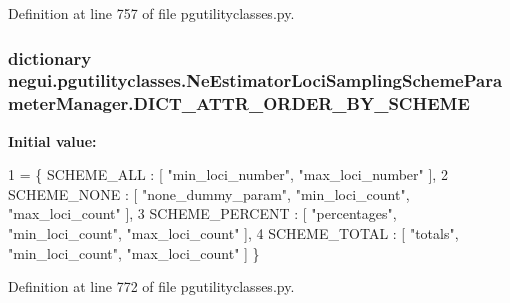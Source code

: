 Definition at line 757 of file pgutilityclasses.\+py.

\subsubsection[{\texorpdfstring{D\+I\+C\+T\+\_\+\+A\+T\+T\+R\+\_\+\+O\+R\+D\+E\+R\+\_\+\+B\+Y\+\_\+\+S\+C\+H\+E\+ME}{DICT_ATTR_ORDER_BY_SCHEME}}]{\setlength{\rightskip}{0pt plus 5cm}dictionary negui.\+pgutilityclasses.\+Ne\+Estimator\+Loci\+Sampling\+Scheme\+Parameter\+Manager.\+D\+I\+C\+T\+\_\+\+A\+T\+T\+R\+\_\+\+O\+R\+D\+E\+R\+\_\+\+B\+Y\+\_\+\+S\+C\+H\+E\+ME\hspace{0.3cm}{\ttfamily [static]}}\hypertarget{classnegui_1_1pgutilityclasses_1_1NeEstimatorLociSamplingSchemeParameterManager_abf68e40a527ee3a60eadbf670b02c656}{}\label{classnegui_1_1pgutilityclasses_1_1NeEstimatorLociSamplingSchemeParameterManager_abf68e40a527ee3a60eadbf670b02c656}
{\bfseries Initial value\+:}
\begin{DoxyCode}
1 = \{ SCHEME\_ALL : [ \textcolor{stringliteral}{"min\_loci\_number"}, \textcolor{stringliteral}{"max\_loci\_number"} ], 
2                                     SCHEME\_NONE : [ \textcolor{stringliteral}{"none\_dummy\_param"}, \textcolor{stringliteral}{"min\_loci\_count"}, \textcolor{stringliteral}{"max\_loci\_count"} 
      ],
3                                     SCHEME\_PERCENT : [ \textcolor{stringliteral}{"percentages"}, \textcolor{stringliteral}{"min\_loci\_count"}, \textcolor{stringliteral}{"max\_loci\_count"} ],
4                                     SCHEME\_TOTAL : [ \textcolor{stringliteral}{"totals"}, \textcolor{stringliteral}{"min\_loci\_count"}, \textcolor{stringliteral}{"max\_loci\_count"} ] \}
\end{DoxyCode}


Definition at line 772 of file pgutilityclasses.\+py.

